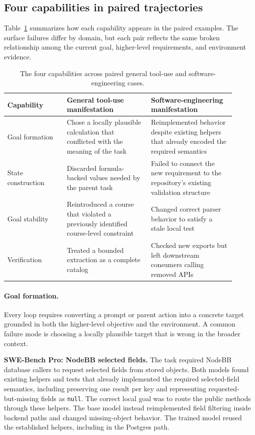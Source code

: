\documentclass{article}
\begin{document}
\subsection{Four capabilities in paired trajectories}
\label{sec:capabilities}

Table~\ref{tab:manifestations} summarizes how each capability appears in the paired examples. The surface failures differ by domain, but each pair reflects the same broken relationship among the current goal, higher-level requirements, and environment evidence.

\begin{table}[H]
\centering
\caption{The four capabilities across paired general tool-use and software-engineering cases.}
\label{tab:manifestations}
\begin{tabular}{p{0.24\linewidth}p{0.34\linewidth}p{0.34\linewidth}}
\toprule
Capability & General tool-use manifestation & Software-engineering manifestation \\
\midrule
Goal formation & Chose a locally plausible calculation that conflicted with the meaning of the task & Reimplemented behavior despite existing helpers that already encoded the required semantics \\
\addlinespace
State construction & Discarded formula-backed values needed by the parent task & Failed to connect the new requirement to the repository's existing validation structure \\
\addlinespace
Goal stability & Reintroduced a course that violated a previously identified course-level constraint & Changed correct parser behavior to satisfy a stale local test \\
\addlinespace
Verification & Treated a bounded extraction as a complete catalog & Checked new exports but left downstream consumers calling removed APIs \\
\bottomrule
\end{tabular}
\end{table}

\paragraph{Goal formation.}
Every loop requires converting a prompt or parent action into a concrete target grounded in both the higher-level objective and the environment. A common failure mode is choosing a locally plausible target that is wrong in the broader context.

\textbf{SWE-Bench Pro: NodeBB selected fields.} The task required NodeBB database callers to request selected fields from stored objects. Both models found existing helpers and tests that already implemented the required selected-field semantics, including preserving one result per key and representing requested-but-missing fields as \texttt{null}. The correct local goal was to route the public methods through these helpers. The base model instead reimplemented field filtering inside backend paths and changed missing-object behavior. The trained model reused the established helpers, including in the Postgres path.
\end{document}
